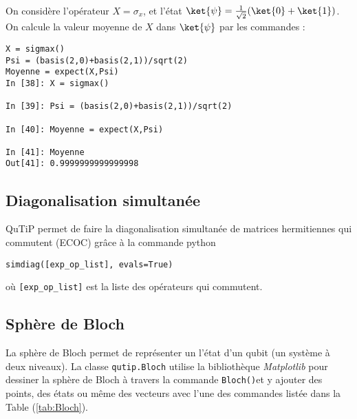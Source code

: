 \begin{example}
On considère l'opérateur $X=\sigma_x$, et l'état 
$\ket{\psi}=\frac{1}{\sqrt{2}}(\ket{0}+\ket{1})$. On calcule la valeur moyenne 
de $X$ dans $\ket{\psi}$ par les commandes :
\end{example}
\begin{lstlisting}
X = sigmax()
Psi = (basis(2,0)+basis(2,1))/sqrt(2)
Moyenne = expect(X,Psi)
In [38]: X = sigmax()

In [39]: Psi = (basis(2,0)+basis(2,1))/sqrt(2)

In [40]: Moyenne = expect(X,Psi)

In [41]: Moyenne
Out[41]: 0.9999999999999998
\end{lstlisting}

\subsection{Diagonalisation simultanée}

QuTiP permet de faire la diagonalisation simultanée de matrices hermitiennes 
qui commutent (ECOC) grâce à la commande python
\begin{center}
 \texttt{simdiag([exp\_op\_list], evals=True)}
\end{center}
où \texttt{[exp\_op\_list]} est la liste des opérateurs qui commutent.

\subsection{Sphère de Bloch}
La sphère de Bloch permet de représenter un l'état d'un qubit (un système à 
deux niveaux). La classe \texttt{qutip.Bloch} utilise la bibliothèque
\emph{Matplotlib} pour dessiner la sphère de Bloch à travers la commande 
\texttt{Bloch()}et y ajouter des points, des états ou même des vecteurs avec 
l'une des commandes listée dans la Table (\ref{tab:Bloch}).

